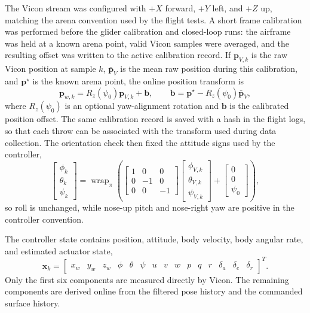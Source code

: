 The Vicon stream was configured with \(+X\) forward, \(+Y\) left, and \(+Z\)
up, matching the arena convention used by the flight tests. A short frame
calibration was performed before the glider calibration and closed-loop runs:
the airframe was held at a known arena point, valid Vicon samples were averaged,
and the resulting offset was written to the active calibration record. If
\(\mathbf{p}_{V,k}\) is the raw Vicon position at sample \(k\),
\(\bar{\mathbf{p}}_V\) is the mean raw position during this calibration, and
\(\mathbf{p}^{\star}\) is the known arena point, the online position transform
is
\begin{equation}
    \mathbf{p}_{w,k}
    =
    R_z(\psi_0)\mathbf{p}_{V,k}+\mathbf{b},
    \qquad
    \mathbf{b}
    =
    \mathbf{p}^{\star}-R_z(\psi_0)\bar{\mathbf{p}}_V ,
    \label{eq:vicon_position_transform}
\end{equation}
where \(R_z(\psi_0)\) is an optional yaw-alignment rotation and \(\mathbf{b}\)
is the calibrated position offset. The same calibration record is saved with a
hash in the flight logs, so that each throw can be associated with the transform
used during data collection. The orientation check then fixed the attitude signs
used by the controller,
\begin{equation}
    \begin{bmatrix}\phi_k\\\theta_k\\\psi_k\end{bmatrix}
    =
    \operatorname{wrap}_{\pi}
    \left(
    \begin{bmatrix}
    1 & 0 & 0\\
    0 & -1 & 0\\
    0 & 0 & -1
    \end{bmatrix}
    \begin{bmatrix}\phi_{V,k}\\\theta_{V,k}\\\psi_{V,k}\end{bmatrix}
    +
    \begin{bmatrix}0\\0\\\psi_0\end{bmatrix}
    \right),
    \label{eq:vicon_attitude_transform}
\end{equation}
so roll is unchanged, while nose-up pitch and nose-right yaw are positive in the
controller convention.

The controller state contains position, attitude, body velocity, body angular
rate, and estimated actuator state,
\begin{equation}
    \mathbf{x}_k =
    \begin{bmatrix}
    x_w & y_w & z_w &
    \phi & \theta & \psi &
    u & v & w &
    p & q & r &
    \delta_a & \delta_e & \delta_r
    \end{bmatrix}^{T}.
    \label{eq:controller_state_from_vicon}
\end{equation}
Only the first six components are measured directly by Vicon. The remaining
components are derived online from the filtered pose history and the commanded
surface history.

